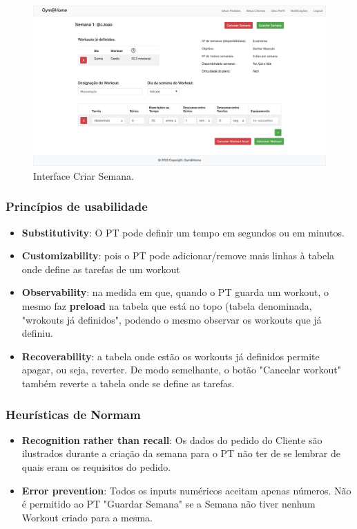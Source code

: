 \begin{figure}[H]
    \centering
    \includegraphics[scale=0.25]{images/interfaces/pt_criar_semana.png}
    \caption{Interface Criar Semana.}
    \label{fig:interfacecriarsemana}
\end{figure}

\subsubsection{Princípios de usabilidade}
\begin{itemize}
    \item \textbf{Substitutivity}: O PT pode definir um tempo em segundos ou em minutos.
    \item \textbf{Customizability}: pois o PT pode adicionar/remove mais linhas à tabela onde define as tarefas de um workout
    \item \textbf{Observability}: na medida em que, quando o PT guarda um workout, o mesmo faz \textbf{preload} na tabela que está no topo (tabela denominada, "wrokouts já definidos", podendo o mesmo observar os workouts que já definiu.
    \item \textbf{Recoverability}: a tabela onde estão os workouts já definidos permite apagar, ou seja, reverter. De modo semelhante, o botão "Cancelar workout" também reverte a tabela onde se define as tarefas.
\end{itemize}

\subsubsection{Heurísticas de Normam}
\begin{itemize}
    \item \textbf{Recognition rather than recall}: Os dados do pedido do Cliente são ilustrados durante a criação da semana para o PT não ter de se lembrar de quais eram os requisitos do pedido.
    
    \item \textbf{Error prevention}: Todos os inputs numéricos aceitam apenas números. Não é permitido ao PT "Guardar Semana" se a Semana não tiver nenhum Workout criado para a mesma.
\end{itemize}

